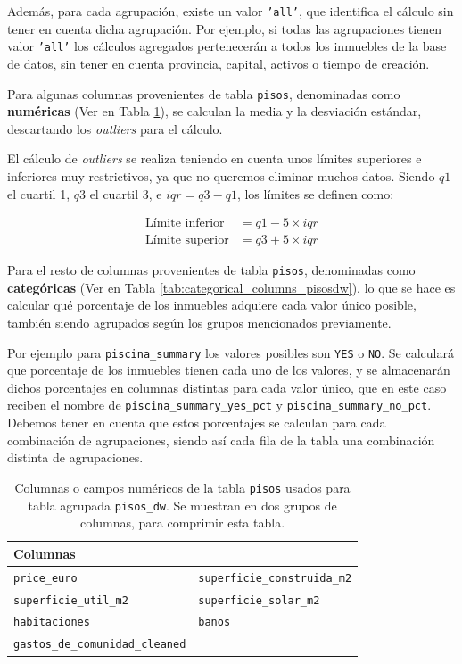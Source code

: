 Además, para cada agrupación, existe un valor \texttt{'all'}, que identifica el cálculo sin tener en cuenta dicha agrupación. Por ejemplo, si todas las agrupaciones tienen valor \texttt{'all'} los cálculos agregados pertenecerán a todos los inmuebles de la base de datos, sin tener en cuenta provincia, capital, activos o tiempo de creación. 

Para algunas columnas provenientes de tabla \texttt{pisos}, denominadas como \textbf{numéricas} (Ver en Tabla \ref{tab:numerical_columns_pisosdw}), se calculan la media y la desviación estándar, descartando los \textit{outliers} para el cálculo.

El cálculo de \textit{outliers} se realiza teniendo en cuenta unos límites superiores e inferiores muy restrictivos, ya que no queremos eliminar muchos datos. Siendo $q1$ el cuartil 1, $q3$ el cuartil 3, e $iqr = q3 - q1$, los límites se definen como:

\begin{align*}
\text{Límite inferior} &= q1 - 5 \times iqr \\
\text{Límite superior} &= q3 + 5 \times iqr
\end{align*}

Para el resto de columnas provenientes de tabla \texttt{pisos}, denominadas como \textbf{categóricas} (Ver en Tabla \ref{tab:categorical_columns_pisosdw}), lo que se hace es calcular qué porcentaje de los inmuebles adquiere cada valor único posible, también siendo agrupados según los grupos mencionados previamente.

Por ejemplo para \texttt{piscina\_summary} los valores posibles son \texttt{YES} o \texttt{NO}. Se calculará que porcentaje de los inmuebles tienen cada uno de los valores, y se almacenarán dichos porcentajes en columnas distintas para cada valor único, que en este caso reciben el nombre de \texttt{piscina\_summary\_yes\_pct} y \texttt{piscina\_summary\_no\_pct}. Debemos tener en cuenta que estos porcentajes se calculan para cada combinación de agrupaciones, siendo así cada fila de la tabla una combinación distinta de agrupaciones.

\begin{table}[h]
\centering
\begin{tabular}{@{}ll@{}}
\toprule
\textbf{Columnas} & \\
\midrule
\texttt{price\_euro} & \texttt{superficie\_construida\_m2} \\
\texttt{superficie\_util\_m2} & \texttt{superficie\_solar\_m2} \\
\texttt{habitaciones} & \texttt{banos} \\
\texttt{gastos\_de\_comunidad\_cleaned} &  \\
\bottomrule
\end{tabular}
\caption[Columnas numéricas de la tabla \texttt{pisos} usadas para tabla agrupada \texttt{pisos\_dw}]{Columnas o campos numéricos de la tabla \texttt{pisos} usados para tabla agrupada \texttt{pisos\_dw}. Se muestran en dos grupos de columnas, para comprimir esta tabla.}
\label{tab:numerical_columns_pisosdw}
\end{table}

